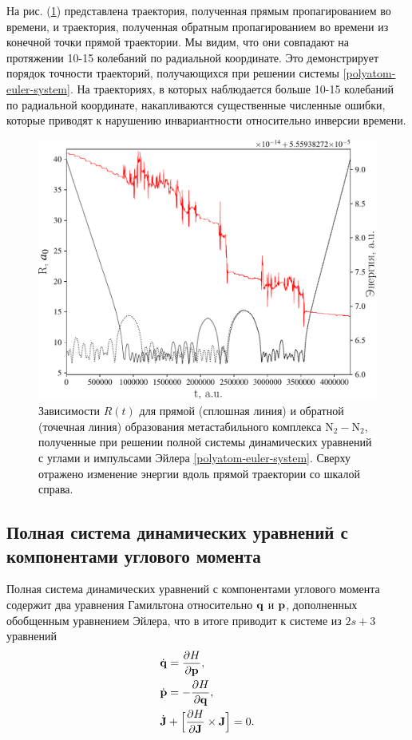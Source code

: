 На рис. (\ref{fig:euler-trajectory}) представлена траектория, полученная прямым пропагированием во времени, и траектория, полученная обратным пропагированием во времени из конечной точки прямой траектории. Мы видим, что они совпадают на протяжении 10-15 колебаний по радиальной координате. Это демонстрирует порядок точности траекторий, получающихся при решении системы \eqref{polyatom-euler-system}. На траекториях, в которых наблюдается больше 10-15 колебаний по радиальной координате, накапливаются существенные численные ошибки, которые приводят к нарушению инвариантности относительно инверсии времени.

\begin{figure}[H]
    \centering
    \includegraphics[width=0.75\linewidth]{./pictures/trajectories/euler_trajectory-crop.pdf}
\caption{Зависимости $R(t)$ для прямой (сплошная линия) и обратной (точечная линия) образования метастабильного комплекса N$_2-$N$_2$, полученные при решении полной системы динамических уравнений с углами и импульсами Эйлера \eqref{polyatom-euler-system}. Сверху отражено изменение энергии вдоль прямой траектории со шкалой справа.}
    \label{fig:euler-trajectory}
\end{figure}

\subsection{Полная система динамических уравнений с компонентами углового момента}
    Полная система динамических уравнений с компонентами углового момента содержит два уравнения Гамильтона относительно $\mathbf{q}$ и $\mathbf{p}$, дополненных обобщенным уравнением Эйлера, что в итоге приводит к системе из $2s + 3$ уравнений
\begin{gather}
    \begin{aligned}
        &\dot{\mathbf{q}} = \frac{\partial H}{\partial \mathbf{p}}, \\
        &\dot{\mathbf{p}} = -\frac{\partial H}{\partial \mathbf{q}}, \\
        &\dot{\mathbf{J}} + \Big[ \frac{\partial H}{\partial \mathbf{J}} \times \mathbf{J} \Big] = 0.
    \end{aligned}
\end{gather}

